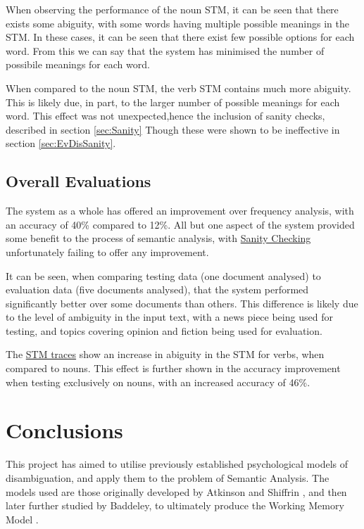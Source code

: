 \documentclass[]{article}
\begin{document}
When observing the performance of the noun STM, it can be seen that there exists some abiguity, with some words having multiple possible meanings in the STM. In these cases, it can be seen that there exist few possible options for each word. From this we can say that the system has minimised the number of possibile meanings for each word.

When compared to the noun STM, the verb STM contains much more abiguity. This is likely due, in part, to the larger number of possible meanings for each word. This effect was not unexpected,hence the inclusion of sanity checks, described in section \ref{sec:Sanity} Though these were shown to be ineffective in section \ref{sec:EvDisSanity}.

\subsection{Overall Evaluations}
\label{EvOverall}
The system as a whole has offered an improvement over frequency analysis, with an accuracy of 40\% compared to 12\%. All but one aspect of the system provided some benefit to the process of semantic analysis, with \hyperref[sec:EvDisSanity]{Sanity Checking} unfortunately failing to offer any improvement. 

It can be seen, when comparing testing data (one document analysed) to evaluation data (five documents analysed), that the system performed significantly better over some documents than others. This difference is likely due to the level of ambiguity in the input text, with a news piece being used for testing, and topics covering opinion and fiction being used for evaluation.

The \hyperref[sec:EvTrace]{STM traces} show an increase in abiguity in the STM for verbs, when compared to nouns. This effect is further shown in the accuracy improvement when testing exclusively on nouns, with an increased accuracy of 46\%.



\section{Conclusions}
\label{sec:Conclusions}
This project has aimed to utilise previously established psychological models of disambiguation, and apply them to the problem of Semantic Analysis. The models used are those originally developed by Atkinson and Shiffrin \cite{ControlProcessesSTMAtkinson}, and then later further studied by Baddeley, to ultimately produce the Working Memory Model \cite{MemoryBaddeleyEysenkAnderson}.
\end{document}
